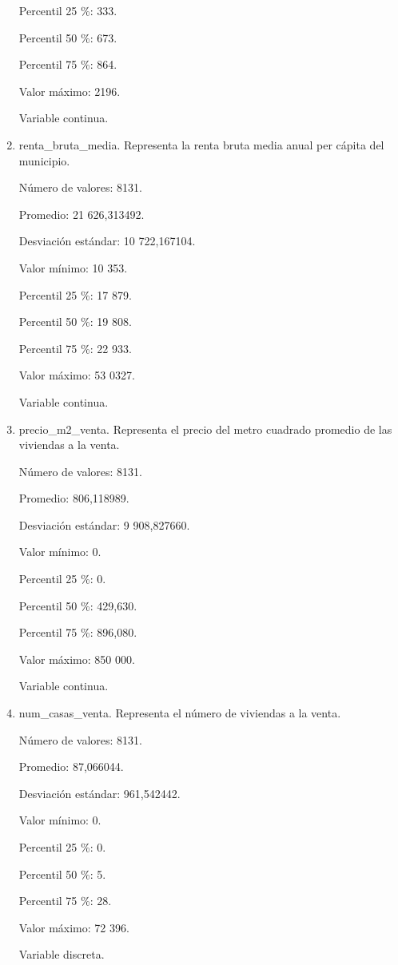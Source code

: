 \begin{enumerate}
	Percentil 25 \%: 333.
	
	Percentil 50 \%: 673.
	
	Percentil 75 \%: 864.
	
	Valor máximo: 2196.
	
	Variable continua.

	\item renta\_bruta\_media. Representa la renta bruta media anual per cápita del municipio.
	
	Número de valores: 8131.
	
	Promedio: 21 626,313492.
	
	Desviación estándar: 10 722,167104.
	
	Valor mínimo: 10 353.
	
	Percentil 25 \%: 17 879.
	
	Percentil 50 \%: 19 808.
	
	Percentil 75 \%: 22 933.
	
	Valor máximo: 53 0327.
	
	Variable continua.

	\item precio\_m2\_venta. Representa el precio del metro cuadrado promedio de las viviendas a la venta.
	
	Número de valores: 8131.
	
	Promedio: 806,118989.
	
	Desviación estándar: 9 908,827660.
	
	Valor mínimo: 0.
	
	Percentil 25 \%: 0.
	
	Percentil 50 \%: 429,630.
	
	Percentil 75 \%: 896,080.
	
	Valor máximo: 850 000.
	
	Variable continua.

	\item num\_casas\_venta. Representa el número de viviendas a la venta.
	
	Número de valores: 8131.
	
	Promedio: 87,066044.
	
	Desviación estándar: 961,542442.
	
	Valor mínimo: 0.
	
	Percentil 25 \%: 0.
	
	Percentil 50 \%: 5.
	
	Percentil 75 \%: 28.
	
	Valor máximo: 72 396.
	
	Variable discreta.


\end{enumerate}
